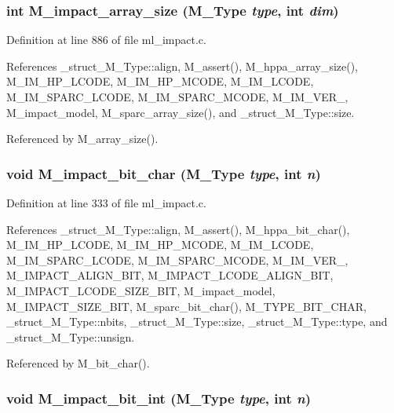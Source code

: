 \subsubsection{\setlength{\rightskip}{0pt plus 5cm}int M\_\-impact\_\-array\_\-size (\bf{M\_\-Type} {\em type}, int {\em dim})}\label{m__impact_8h_3205c56b2c4afe8a50fa5be7feee38ca}




Definition at line 886 of file ml\_\-impact.c.

References \_\-struct\_\-M\_\-Type::align, M\_\-assert(), M\_\-hppa\_\-array\_\-size(), M\_\-IM\_\-HP\_\-LCODE, M\_\-IM\_\-HP\_\-MCODE, M\_\-IM\_\-LCODE, M\_\-IM\_\-SPARC\_\-LCODE, M\_\-IM\_\-SPARC\_\-MCODE, M\_\-IM\_\-VER\_, M\_\-impact\_\-model, M\_\-sparc\_\-array\_\-size(), and \_\-struct\_\-M\_\-Type::size.

Referenced by M\_\-array\_\-size().
\subsubsection{\setlength{\rightskip}{0pt plus 5cm}void M\_\-impact\_\-bit\_\-char (\bf{M\_\-Type} {\em type}, int {\em n})}\label{m__impact_8h_3170e2b73eda536371bef6cd734bcb26}




Definition at line 333 of file ml\_\-impact.c.

References \_\-struct\_\-M\_\-Type::align, M\_\-assert(), M\_\-hppa\_\-bit\_\-char(), M\_\-IM\_\-HP\_\-LCODE, M\_\-IM\_\-HP\_\-MCODE, M\_\-IM\_\-LCODE, M\_\-IM\_\-SPARC\_\-LCODE, M\_\-IM\_\-SPARC\_\-MCODE, M\_\-IM\_\-VER\_, M\_\-IMPACT\_\-ALIGN\_\-BIT, M\_\-IMPACT\_\-LCODE\_\-ALIGN\_\-BIT, M\_\-IMPACT\_\-LCODE\_\-SIZE\_\-BIT, M\_\-impact\_\-model, M\_\-IMPACT\_\-SIZE\_\-BIT, M\_\-sparc\_\-bit\_\-char(), M\_\-TYPE\_\-BIT\_\-CHAR, \_\-struct\_\-M\_\-Type::nbits, \_\-struct\_\-M\_\-Type::size, \_\-struct\_\-M\_\-Type::type, and \_\-struct\_\-M\_\-Type::unsign.

Referenced by M\_\-bit\_\-char().
\subsubsection{\setlength{\rightskip}{0pt plus 5cm}void M\_\-impact\_\-bit\_\-int (\bf{M\_\-Type} {\em type}, int {\em n})}\label{m__impact_8h_e1fcafda2c971ef1031e21e5e315fa82}




